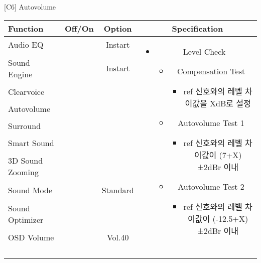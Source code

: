 \begin{frame}[t]{[C6] Autovolume}
\begin{tiny}
\begin{tabular}{@{}lccc@{}}
\toprule
Function & Off/On & Option & Specification \\
\midrule
Audio EQ & \color{black}{Off} & Instart &
\multirow{10}{60mm}{
\begin{itemize}
\item Level Check
	\begin{itemize}
	\item Compensation Test
		\begin{itemize}\tiny
		\item ref 신호와의 레벨 차이값을 XdB로 설정
		\end{itemize}
	\item Autovolume Test 1
		\begin{itemize}\tiny
		\item ref 신호와의 레벨 차이값이 (7+X)±2dBr 이내
		\end{itemize}
	\item Autovolume Test 2
		\begin{itemize}\tiny
		\item ref 신호와의 레벨 차이값이 (-12.5+X)±2dBr 이내
		\end{itemize}
	\end{itemize}
\end{itemize}
} \\
Sound Engine & \color{blue}{On} & Instart & \\
Clearvoice & \color{black}{Off} & & \\
Autovolume & \color{blue}{On} & & \\
Surround & \color{black}{Off} & & \\
Smart Sound & \color{black}{Off} & & \\
3D Sound Zooming & \color{black}{Off} & & \\
Sound Mode & \color{blue}{On} & Standard & \\
Sound Optimizer & \color{black}{Off} & & \\
OSD Volume & \color{blue}{On} & Vol.40 & \\
& & & \\
& & & \\
& & & \\
& & & \\
\midrule
\end{tabular}
\end{tiny}

\end{frame}
